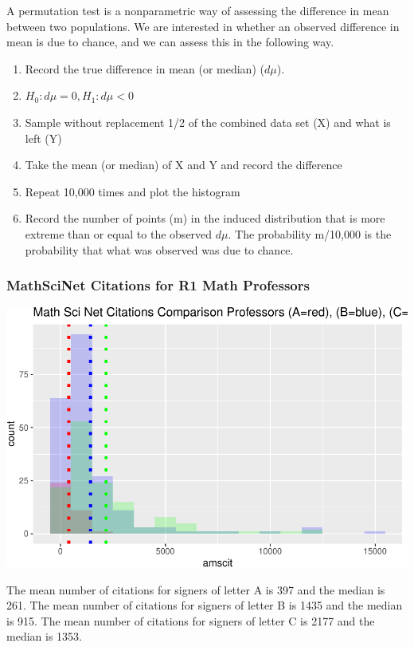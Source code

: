 \documentclass[]{article}
\providecommand{\tightlist}{%
  \setlength{\itemsep}{0pt}\setlength{\parskip}{0pt}}
\begin{document}
A permutation test is a nonparametric way of assessing the difference in
mean between two populations. We are interested in whether an observed
difference in mean is due to chance, and we can assess this in the
following way.

\begin{enumerate}
\def\labelenumi{\arabic{enumi}.}
\setcounter{enumi}{-1}
\tightlist
\item
  Record the true difference in mean (or median) (\(d\mu\)).
\item
  \(H_0: d\mu = 0, H_1: d\mu < 0\)
\item
  Sample without replacement 1/2 of the combined data set (X) and what
  is left (Y)
\item
  Take the mean (or median) of X and Y and record the difference
\item
  Repeat 10,000 times and plot the histogram
\item
  Record the number of points (m) in the induced distribution that is
  more extreme than or equal to the observed \(d\mu\). The probability
  m/10,000 is the probability that what was observed was due to chance.
\end{enumerate}

\hypertarget{mathscinet-citations-for-r1-math-professors}{%
\subsubsection{MathSciNet Citations for R1 Math
Professors}\label{mathscinet-citations-for-r1-math-professors}}

\includegraphics{Response_files/figure-latex/unnamed-chunk-10-1.pdf}

The mean number of citations for signers of letter A is 397 and the
median is 261. The mean number of citations for signers of letter B is
1435 and the median is 915. The mean number of citations for signers of
letter C is 2177 and the median is 1353.
\end{document}

